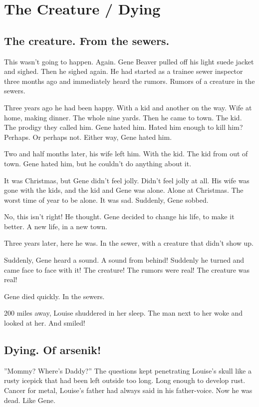 \chapter{The Creature / Dying}


\section*{The creature. From the sewers.}

This wasn't going to happen. Again. Gene Beaver pulled off his light
suede jacket and sighed. Then he sighed again. He had started as a
trainee sewer inspector three months ago and immediately heard the
rumors. Rumors of a creature in the sewers.

Three years ago he had been happy. With a kid and another on the
way. Wife at home, making dinner. The whole nine yards. Then he came to
town. The kid. The prodigy they called him. Gene hated him. Hated him
enough to kill him? Perhaps. Or perhaps not. Either way, Gene hated him.

Two and half months later, his wife left him. With the kid. The kid from
out of town. Gene hated him, but he couldn't do anything about it.

It was Christmas, but Gene didn't feel jolly. Didn't feel jolly at
all. His wife was gone with the kids, and the kid and Gene was
alone. Alone at Christmas. The worst time of year to be alone. It was
sad. Suddenly, Gene sobbed.

No, this isn't right! He thought. Gene decided to change his life, to
make it better. A new life, in a new town.

Three years later, here he was. In the sewer, with a creature that
didn't show up.

Suddenly, Gene heard a sound. A sound from behind! Suddenly he turned
and came face to face with it! The creature! The rumors were real! The
creature was real!

Gene died quickly. In the sewers.

200 miles away, Louise shuddered in her sleep. The man next to her woke
and looked at her. And smiled!

\section*{Dying. Of arsenik!}



''Mommy? Where's Daddy?'' The questions kept
penetrating Louise's skull like a rusty icepick that had been
left outside too long. Long enough to develop rust. Cancer for
metal, Louise's father had always said in his father-voice. Now he
was dead. Like Gene.



